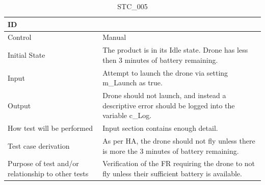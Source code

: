 \documentclass[12pt, titlepage]{article}
\begin{document}
\begin{table}[!h]
\begin{center}
\caption {STC\_005}
\label{tab:STC_005}
\begin{tabular}{ | m{3.2cm} | m{12.2cm} | } 
\hline
ID & \nameref{tab:STC_005} \\ 
\hline
Control & Manual \\ 
\hline
Initial State & The product is in its Idle state. Drone has less then 3 minutes of battery remaining.  \\ 
\hline
Input & Attempt to launch the drone via setting m\_Launch as true. \\ 
\hline
Output & Drone should not launch, and instead a descriptive error should be logged into the variable c\_Log.  \\ 
\hline
How test will be performed & Input section contains enough detail. \\ 
\hline
Test case derivation & As per HA, the drone should not fly unless there is more the 3 minutes of battery remaining.
 \\ 
\hline
Purpose of test and/or relationship to other tests & Verification of the FR requiring the drone to not fly unless their sufficient battery is available. 
\\ 
\hline
\end{tabular}
\end{center}
\end{table}
\end{document}
